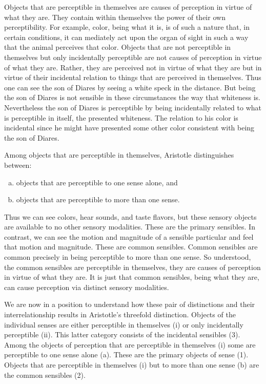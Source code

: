 Objects that are perceptible in themselves are causes of perception in virtue of what they are. They contain within themselves the power of their own perceptibility. For example, color, being what it is, is of such a nature that, in certain conditions, it can mediately act upon the organ of sight in such a way that the animal perceives that color. Objects that are not perceptible in themselves but only incidentally perceptible are not causes of perception in virtue of what they are. Rather, they are perceived not in virtue of what they are but in virtue of their incidental relation to things that are perceived in themselves. Thus one can see the son of Diares by seeing a white speck in the distance. But being the son of Diares is not sensible in these circumstances the way that whiteness is. Nevertheless the son of Diares is perceptible by being incidentally related to what is perceptible in itself, the presented whiteness. The relation to his color is incidental since he might have presented some other color consistent with being the son of Diares.

Among objects that are perceptible in themselves, Aristotle distinguishes between:
\begin{enumerate}[(a)]
	\item objects that are perceptible to one sense alone, and
	\item objects that are perceptible to more than one sense.
\end{enumerate}
Thus we can see colors, hear sounds, and taste flavors, but these sensory objects are available to no other sensory modalities. These are the primary sensibles. In contrast, we can see the motion and magnitude of a sensible particular and feel that motion and magnitude. These are common sensibles. Common sensibles are common precisely in being perceptible to more than one sense. So understood, the common sensibles are perceptible in themselves, they are causes of perception in virtue of what they are. It is just that common sensibles, being what they are, can cause perception via distinct sensory modalities.

We are now in a position to understand how these pair of distinctions and their interrelationship results in Aristotle's threefold distinction. Objects of the individual senses are either perceptible in themselves (i) or only incidentally perceptible (ii). This latter category consists of the incidental sensibles (3). Among the objects of perception that are perceptible in themselves (i) some are perceptible to one sense alone (a). These are the primary objects of sense (1). Objects that are perceptible in themselves (i) but to more than one sense (b) are the common sensibles (2).

